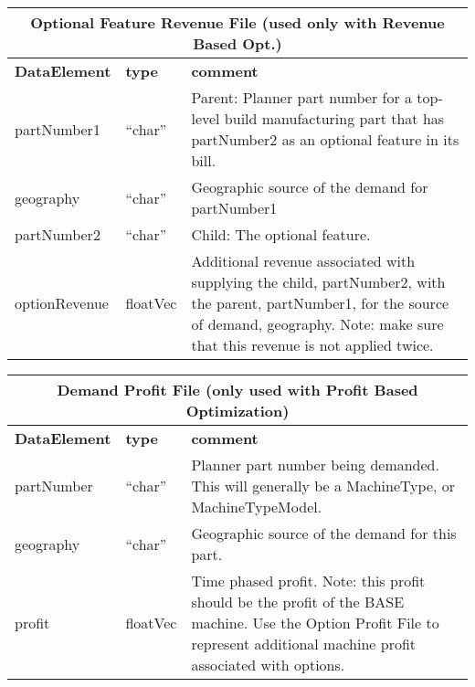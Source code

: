 \begin{tabular}{llp{4in}}
\multicolumn{3}{c}{{\bf Optional Feature Revenue File 
          (used only with Revenue Based Opt.)}}\\ 
     \hline\hline
{\bf DataElement} &  {\bf type}  &   {\bf comment} \\ \hline
partNumber1 & ``char'' &    Parent: Planner part number for a top-level build manufacturing 
                           part that has 
                           partNumber2 as an optional feature in its bill. \\
geography  & ``char'' &   Geographic source of the demand for partNumber1 \\
partNumber2 & ``char'' &    Child: The optional feature. \\
optionRevenue  & floatVec &  Additional revenue associated with supplying the child, partNumber2,
                           with the parent, partNumber1, for the source of demand, geography.
                           Note: make sure that this revenue is not applied twice.
\end{tabular}

\vspace{.5in}

\begin{tabular}{llp{4in}}
\multicolumn{3}{c}{{\bf Demand Profit File  (only used with Profit Based Optimization)}}\\ 
     \hline\hline
{\bf DataElement} &  {\bf type}  &   {\bf comment} \\ \hline
partNumber & ``char'' & Planner part number being demanded.  This will generally be a
                       MachineType, or MachineTypeModel. \\
geography  & ``char'' &     Geographic source of the demand for this part. \\
profit     &  floatVec &  Time phased profit.  Note: this profit  should be
                       the profit  of the BASE machine.  Use the Option
                       Profit File to represent additional machine
                       profit associated with options.
\end{tabular}

\vspace{.5in}

